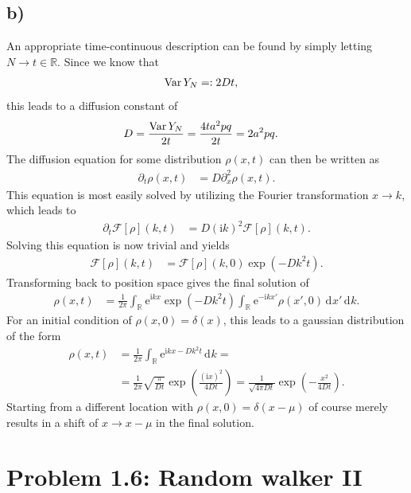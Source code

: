 \documentclass[english, parskip=full]{scrartcl}
\newcommand{\intr}{}
\newcommand{\kla}{}
\newcommand{\tecxt}{}
\renewcommand{\i}{\text{i}}
\newcommand{\e}{\text{e}}
\begin{document}
\subsection*{b)}
An appropriate time-continuous description can be found by simply letting $N\rightarrow t\in\mathbb{R}$.
Since we know that
\begin{align}
\tecxt\text{Var\,}Y_N&=:2Dt,
\end{align}
this leads to a diffusion constant of
\begin{align}
D&=\frac{\tecxt\text{Var\,}Y_N}{2t}=\frac{4ta^2pq}{2t}=2a^2pq.
\end{align}
The diffusion equation for some distribution $\rho(x,t)$ can then be written as
\begin{align}
\partial_t\rho(x,t)&=D\partial_x^2\rho(x,t).
\end{align}
This equation is most easily solved by utilizing the Fourier transformation $x\rightarrow k$, which leads to
\begin{align}
\partial_t\mathcal{F}[\rho](k,t)&=D(\i k)^2\mathcal{F}[\rho](k,t).
\end{align}
Solving this equation is now trivial and yields
\begin{align}
\mathcal{F}[\rho](k,t)&=\mathcal{F}[\rho](k,0)\exp\kla\left( -Dk^2t \right).
\end{align}
Transforming back to position space gives the final solution of
\begin{align}
\rho(x,t)&=\frac{1}{2\pi}\intr\int_{\mathbb{R}^{ }} \e^{\i kx}\exp\kla\left( -Dk^2t \right)\intr\int_{\mathbb{R}^{ }} \e^{-\i kx'}\rho(x',0) \, \mathrm{d}^{ }x' \, \mathrm{d}^{ }k.
\end{align}
For an initial condition of $\rho(x,0)=\delta(x)$, this leads to a gaussian distribution of the form
\begin{align}
\rho(x,t)&=\frac{1}{2\pi}\intr\int_{\mathbb{R}^{ }} \e^{\i kx-Dk^2t} \, \mathrm{d}^{ }k=\\
&=\frac{1}{2\pi}\sqrt{\frac{\pi}{Dt}}\exp\kla\left( \frac{(\i x)^2}{4Dt} \right)=\frac{1}{\sqrt{4\pi Dt}}\exp\kla\left( -\frac{x^2}{4Dt} \right).
\end{align}
Starting from a different location with $\rho(x,0)=\delta(x-\mu)$ of course merely results in a shift of $x\rightarrow x-\mu$ in the final solution.
\section*{Problem 1.6: Random walker II}
\end{document}
